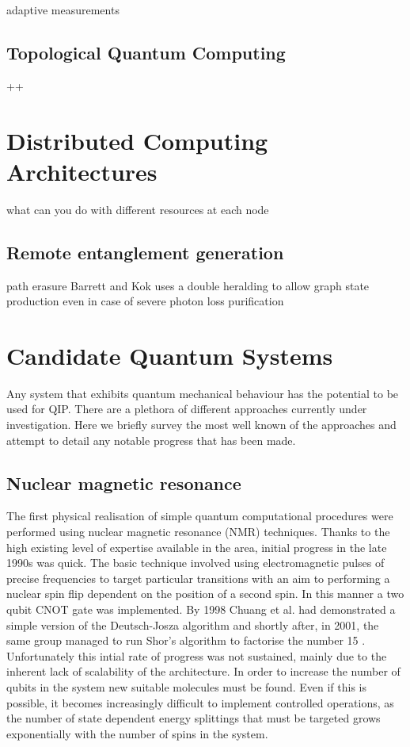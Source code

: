 adaptive measurements


\subsection{Topological Quantum Computing}

++


\section{Distributed Computing Architectures}


what can you do with different resources at each node
\cite{effiecient_distributed_qip_13}

\subsection{Remote entanglement generation}

path erasure \cite{basic_path_erasure} \cite{path_erasure_beam_splitter}
Barrett and Kok \cite{barrett+kok} uses a double heralding to allow graph state production even in case of severe photon loss
purification

\section{Candidate Quantum Systems}

Any system that exhibits quantum mechanical behaviour has the potential to be used for QIP. There are a plethora of different approaches currently under investigation. Here we briefly survey the most well known of the approaches and attempt to detail any notable progress that has been made.

\subsection{Nuclear magnetic resonance}
The first physical realisation of simple quantum computational procedures were performed using nuclear magnetic resonance (NMR) techniques. Thanks to the high existing level of expertise available in the area, initial progress in the late 1990s was quick. The basic technique involved using electromagnetic pulses of precise frequencies to target particular transitions with an aim to performing a nuclear spin flip dependent on the position of a second spin. In this manner a two qubit CNOT gate was implemented. By 1998 Chuang et al. had demonstrated a simple version of the Deutsch-Josza algorithm \cite{chuang_first_nmr_realisation_98} and shortly after, in 2001, the same group managed to run Shor’s algorithm to factorise the number 15 \cite{nmr_factorise_15_01}. Unfortunately this intial rate of progress was not sustained, mainly due to the inherent lack of scalability of the architecture. In order to increase the number of qubits in the system new suitable molecules must be found. Even if this is possible, it becomes increasingly difficult to implement controlled operations, as the number of state dependent energy splittings that must be targeted grows exponentially with the number of spins in the system.


